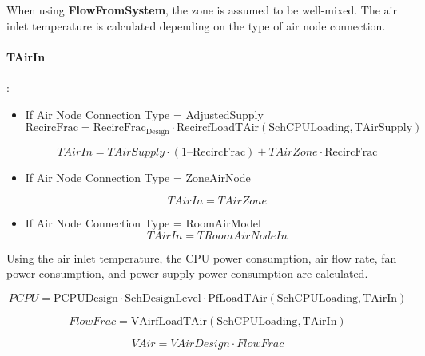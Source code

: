 When using \textbf{FlowFromSystem}, the zone is assumed to be well-mixed. The air inlet temperature is calculated depending on the type of air node connection.

\paragraph{TAirIn}:

\begin{itemize}
    \tightlist
  \item
    If Air Node Connection Type = AdjustedSupply
\begin{equation}
\textrm{RecircFrac} = \textrm{RecircFrac}_{\textrm{Design}} \cdot \textrm{RecircfLoadTAir}(\textrm{SchCPULoading}, \textrm{TAirSupply})
\end{equation}

\begin{equation}
TAirIn = TAirSupply \cdot (1 – \textrm{RecircFrac}) + TAirZone \cdot \textrm{RecircFrac}
\end{equation}

  \item
    If Air Node Connection Type = ZoneAirNode
    
\begin{equation}
TAirIn = TAirZone
\end{equation}

  \item
    If Air Node Connection Type = RoomAirModel
\begin{equation}
TAirIn = TRoomAirNodeIn
\end{equation}

\end{itemize}

Using the air inlet temperature, the CPU power consumption, air flow rate, fan power consumption, and power supply power consumption are calculated.

\begin{equation}
PCPU = \textrm{PCPUDesign} \cdot \textrm{SchDesignLevel} \cdot \textrm{PfLoadTAir}(\textrm{SchCPULoading}, \textrm{TAirIn})
\end{equation}

\begin{equation}
FlowFrac = \textrm{VAirfLoadTAir}(\textrm{SchCPULoading}, \textrm{TAirIn})
\end{equation}

\begin{equation}
VAir = VAirDesign \cdot FlowFrac
\end{equation}

